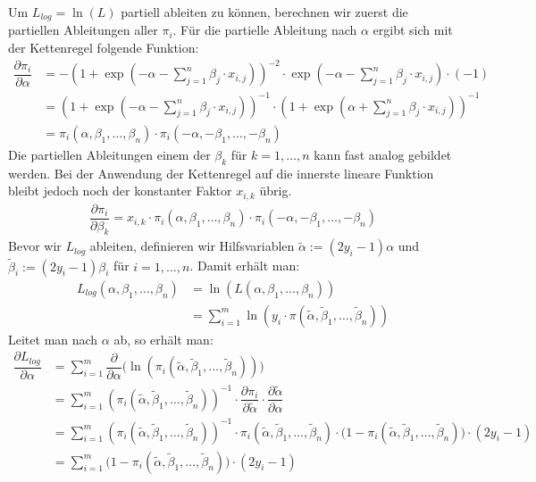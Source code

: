 Um $L_{log} = \ln(L)$ partiell ableiten zu können, berechnen wir zuerst die partiellen Ableitungen aller $\pi_i$. Für die partielle Ableitung nach $\alpha$ ergibt sich mit der Kettenregel folgende Funktion:
\begin{align*}
    \dfrac{\partial \pi_i}{\partial \alpha} &= - \left( 1 + \exp \left(- \alpha - \sum_{j=1}^n \beta_j \cdot x_{i, j} \right) \right)^{-2} \cdot \exp \left(- \alpha - \sum_{j=1}^n \beta_j \cdot x_{i, j} \right) \cdot (-1) \\
    &= \left( 1 + \exp \left(- \alpha - \sum_{j=1}^n \beta_j \cdot x_{i, j} \right) \right)^{-1} \cdot \left( 1 + \exp \left(\alpha + \sum_{j=1}^n \beta_j \cdot x_{i, j} \right) \right)^{-1} \\
    &= \pi_i(\alpha, \beta_1, \dots, \beta_n) \cdot \pi_i(- \alpha, - \beta_1, \dots, - \beta_n)
\end{align*}
Die partiellen Ableitungen einem der $\beta_k$ für $k = 1, \dots, n$ kann fast analog gebildet werden. Bei der Anwendung der Kettenregel auf die innerste lineare Funktion bleibt jedoch noch der konstanter Faktor $x_{i, k}$ übrig.
\begin{align*}
    \dfrac{\partial \pi_i}{\partial \beta_k} = x_{i, k} \cdot \pi_i(\alpha, \beta_1, \dots, \beta_n) \cdot \pi_i(- \alpha, - \beta_1, \dots, - \beta_n)
\end{align*}
Bevor wir $L_{log}$ ableiten, definieren wir Hilfsvariablen $\tilde\alpha := (2 y_i - 1) \alpha$ und $\tilde\beta_i := (2 y_i - 1) \beta_i$ für $i = 1, \dots, n$. Damit erhält man:
\begin{align*}
    L_{log}(\alpha, \beta_1, \dots, \beta_n) &= \ln(L(\alpha, \beta_1, \dots, \beta_n)) \\
    &= \sum_{i=1}^m \ln \left(y_i \cdot \pi(\tilde\alpha, \tilde\beta_1, \dots, \tilde\beta_n) \right)
\end{align*}
Leitet man nach $\alpha$ ab, so erhält man:
\begin{align*}
    \dfrac{\partial L_{log}}{\partial \alpha} &= \sum_{i=1}^m \dfrac{\partial}{\partial \alpha} \bigg( \ln \left( \pi_i(\tilde\alpha, \tilde\beta_1, \dots, \tilde\beta_n) \right) \bigg) \\
    &= \sum_{i=1}^m \left( \pi_i(\tilde\alpha, \tilde\beta_1, \dots, \tilde\beta_n) \right)^{-1} \cdot \dfrac{\partial \pi_i}{\partial \tilde\alpha} \cdot \dfrac{\partial \tilde\alpha}{\partial \alpha} \\
    &= \sum_{i=1}^m \left( \pi_i(\tilde\alpha, \tilde\beta_1, \dots, \tilde\beta_n) \right)^{-1} \cdot \pi_i(\tilde\alpha, \tilde\beta_1, \dots, \tilde\beta_n) \cdot \big(1 - \pi_i(\tilde\alpha, \tilde\beta_1, \dots, \tilde\beta_n) \big) \cdot (2 y_i - 1) \\
    &= \sum_{i=1}^m \big(1 - \pi_i(\tilde\alpha, \tilde\beta_1, \dots, \tilde\beta_n) \big) \cdot (2 y_i - 1)
\end{align*}
